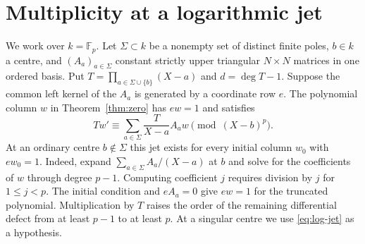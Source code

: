 \section{Multiplicity at a logarithmic jet}\label{sec:zero}

We work over $k=\mathbb F_p$. Let $\Sigma\subset k$ be a nonempty set of
distinct finite poles, $b\in k$ a centre, and $(A_a)_{a\in \Sigma}$ constant
strictly upper triangular $N\times N$ matrices in one ordered basis.
Put $T=\prod_{a\in \Sigma\cup\{b\}}(X-a)$ and $d=\deg T-1$. Suppose the
common left kernel of the $A_a$ is generated by a coordinate row $e$.
The polynomial column $w$ in Theorem~\ref{thm:zero} has $ew=1$ and satisfies
\begin{equation}\label{eq:log-jet}
 T w'\equiv\sum_{a\in \Sigma}\frac{T}{X-a}A_aw\pmod{(X-b)^p}.
\end{equation}
At an ordinary centre $b\notin \Sigma$ this jet exists for every initial
column $w_0$ with $ew_0=1$. Indeed, expand $\sum_{a\in\Sigma} A_a/(X-a)$ at $b$
and solve for the coefficients of $w$ through degree $p-1$. Computing
coefficient $j$ requires division by $j$ for $1\le j<p$. The initial
condition and $eA_a=0$ give $ew=1$ for the truncated polynomial.
Multiplication by $T$ raises the order of the remaining differential
defect from at least $p-1$ to at least $p$. At a singular centre
we use \eqref{eq:log-jet} as a hypothesis.

